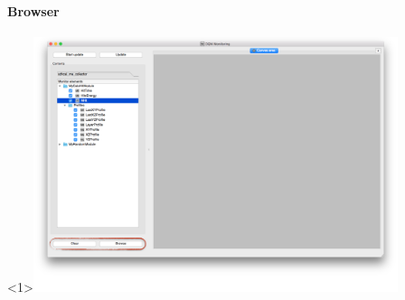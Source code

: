 \documentclass[8pt]{beamer}
\begin{document}
  
 \begin{frame}
    \frametitle{\secname}
    \framesubtitle{ Browser }
    
    \begin{overlayarea}{\textwidth}{\textheight}
    	       \begin{center}

        \begin{onlyenv}<1>\includegraphics[width=0.8\textwidth]{figs/MonitoringGui/MG_Browse.png}\end{onlyenv}
                       \end{center}

       \begin{columns}
       
	 \vspace{-3em}


\end{columns}
\end{overlayarea}
\end{frame}
\end{document}
